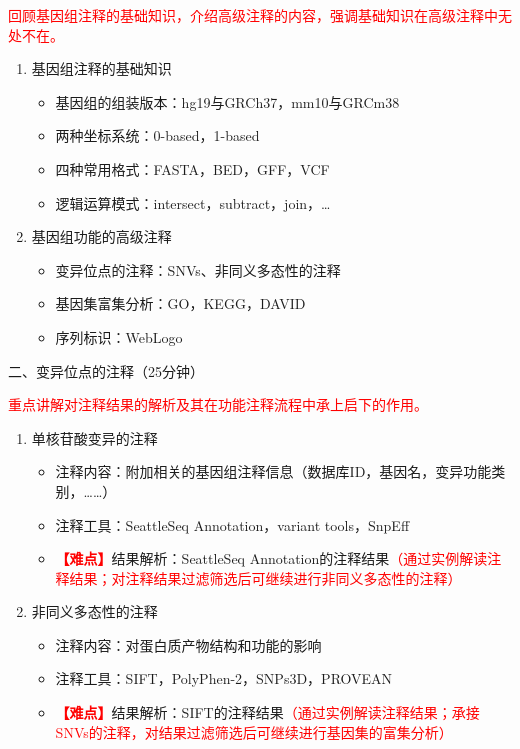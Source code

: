\documentclass{TIJMUjiaoanLL}
\begin{document}
\textcolor{red}{回顾基因组注释的基础知识，介绍高级注释的内容，强调基础知识在高级注释中无处不在。}
\begin{enumerate}
  \item 基因组注释的基础知识
    \begin{itemize}
      \item 基因组的组装版本：hg19与GRCh37，mm10与GRCm38
      \item 两种坐标系统：0-based，1-based
      \item 四种常用格式：FASTA，BED，GFF，VCF
      \item 逻辑运算模式：intersect，subtract，join，\ldots
    \end{itemize}
  \item 基因组功能的高级注释
    \begin{itemize}
      \item 变异位点的注释：SNVs、非同义多态性的注释
      \item 基因集富集分析：GO，KEGG，DAVID
      \item 序列标识：WebLogo
    \end{itemize}
\end{enumerate}

\vspace*{0.2cm}
\noindent
二、变异位点的注释（25分钟）

\textcolor{red}{重点讲解对注释结果的解析及其在功能注释流程中承上启下的作用。}
\begin{enumerate}
  \item 单核苷酸变异的注释
    \begin{itemize}
      \item 注释内容：附加相关的基因组注释信息（数据库ID，基因名，变异功能类别，……）
      \item 注释工具：SeattleSeq Annotation，variant tools，SnpEff
      \item \textcolor{red}{\textbf{【难点】}}结果解析：SeattleSeq Annotation的注释结果\textcolor{red}{（通过实例解读注释结果；对注释结果过滤筛选后可继续进行非同义多态性的注释）}
    \end{itemize}
  \item 非同义多态性的注释
    \begin{itemize}
      \item 注释内容：对蛋白质产物结构和功能的影响
      \item 注释工具：SIFT，PolyPhen-2，SNPs3D，PROVEAN
      \item \textcolor{red}{\textbf{【难点】}}结果解析：SIFT的注释结果\textcolor{red}{（通过实例解读注释结果；承接SNVs的注释，对结果过滤筛选后可继续进行基因集的富集分析）}
    \end{itemize}
\end{enumerate}
\end{document}
